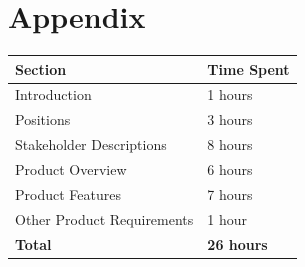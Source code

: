 \documentclass{article}
\begin{document}
\section{Appendix}
\begin{tabular}{|p{5.5cm}|p{6.5cm}|}
\hline
\textbf{Section} & \textbf{Time Spent} \\ \hline
Introduction & 1 hours \\ \hline
Positions & 3 hours \\ \hline
Stakeholder Descriptions & 8 hours \\ \hline
Product Overview & 6 hours \\ \hline
Product Features & 7 hours \\ \hline
Other Product Requirements & 1 hour \\ \hline
\textbf{Total} & \textbf{26 hours} \\ \hline
\end{tabular}
\end{document}
